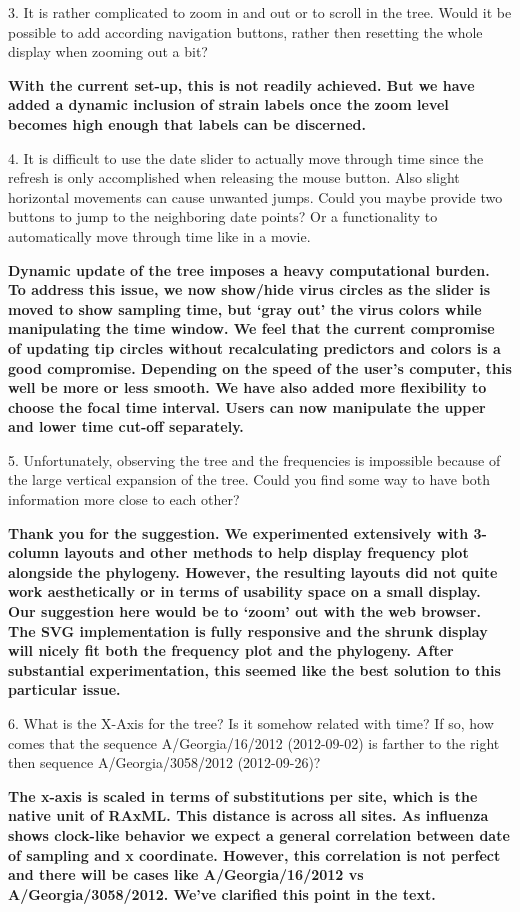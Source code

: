 \documentclass[11pt,oneside,letterpaper]{article}
\begin{document}
3. It is rather complicated to zoom in and out or to scroll in the tree. Would it be possible to add according navigation buttons, rather then resetting the whole display when zooming out a bit?

{\bf With the current set-up, this is not readily achieved. But we have added a dynamic inclusion of strain labels once the zoom level becomes high enough that labels can be discerned.}

4. It is difficult to use the date slider to actually move through time since the refresh is only accomplished when releasing the mouse button. Also slight horizontal movements can cause unwanted jumps. Could you maybe provide two buttons to jump to the neighboring date points? Or a functionality to automatically move through time like in a movie.

{\bf Dynamic update of the tree imposes a heavy computational burden. To address this issue, we now show/hide virus circles as the slider is moved to show sampling time, but `gray out' the virus colors while manipulating the time window. We feel that the current compromise of updating tip circles without recalculating predictors and colors is a good compromise. Depending on the speed of the user's computer, this well be more or less smooth. We have also added more flexibility to choose the focal time interval. Users can now manipulate the upper and lower time cut-off separately.}

5. Unfortunately, observing the tree and the frequencies is impossible because of the large vertical expansion of the tree. Could you find some way to have both information more close to each other?

\textbf{Thank you for the suggestion. We experimented extensively with 3-column layouts and other methods to help display frequency plot alongside the phylogeny. However, the resulting layouts did not quite work aesthetically or in terms of usability space on a small display. Our suggestion here would be to `zoom' out with the web browser. The SVG implementation is fully responsive and the shrunk display will nicely fit both the frequency plot and the phylogeny. After substantial experimentation, this seemed like the best solution to this particular issue.}

6. What is the X-Axis for the tree? Is it somehow related with time? If so, how comes that the sequence A/Georgia/16/2012 (2012-09-02) is farther to the right then sequence A/Georgia/3058/2012 (2012-09-26)?

\textbf{The x-axis is scaled in terms of substitutions per site, which is the native unit of RAxML. This distance is across all sites. As influenza shows clock-like behavior we expect a general correlation between date of sampling and x coordinate. However, this correlation is not perfect and there will be cases like A/Georgia/16/2012 vs A/Georgia/3058/2012. We've clarified this point in the text.}
\end{document}
